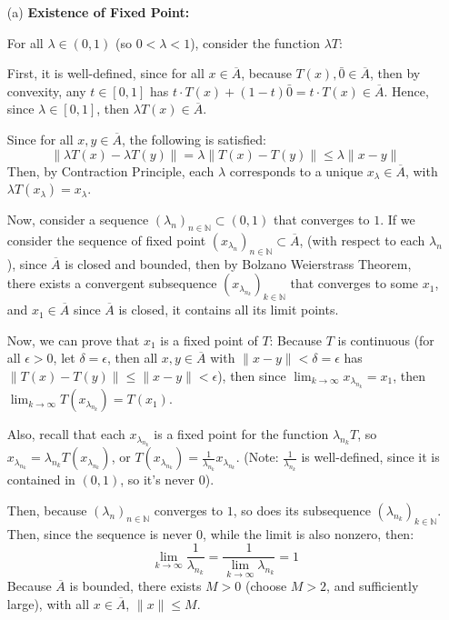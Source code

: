 \documentclass{article}
\begin{document}
\begin{itemize}
    \item[(a)] \textbf{Existence of Fixed Point:}
    
    For all $\lambda\in (0,1)$ (so $0<\lambda<1$), consider the function $\lambda T$: 
    
    First, it is well-defined, since for all $x\in \overline{A}$, because $T(x),\bar{0}\in \overline{A}$,
    then by convexity, any $t\in [0,1]$ has $t\cdot T(x)+(1-t)\bar{0} = t\cdot T(x)\in \overline{A}$.
    Hence, since $\lambda \in [0,1]$, then $\lambda T(x)\in \overline{A}$.

    \hfil
    
    Since for all $x,y\in \overline{A}$, the following is satisfied:
    $$\|\lambda T(x)-\lambda T(y)\| = \lambda\|T(x)-T(y)\| \leq \lambda \|x-y\|$$
    Then, by Contraction Principle, each $\lambda$ corresponds to a unique $x_\lambda\in \overline{A}$, with $\lambda T(x_\lambda)=x_\lambda$.

    \hfil

    Now, consider a sequence $(\lambda_n)_{n\in\mathbb{N}}\subset (0,1)$ that converges to $1$. If we consider the sequence of fixed point $(x_{\lambda_n})_{n\in\mathbb{N}}\subset \overline{A}$,
    (with respect to each $\lambda_n$), since $\overline{A}$ is closed and bounded, then by Bolzano Weierstrass Theorem, 
    there exists a convergent subsequence $(x_{\lambda_{n_k}})_{k\in\mathbb{N}}$ that converges to some $x_1$, and $x_1\in\overline{A}$ since $\overline{A}$ is closed, it contains all its limit points.

    \hfil

    Now, we can prove that $x_1$ is a fixed point of $T$: Because $T$ is continuous (for all $\epsilon>0$, let $\delta=\epsilon$, then all $x,y\in \overline{A}$ with $\|x-y\|<\delta=\epsilon$ has $\|T(x)-T(y)\|\leq \|x-y\|<\epsilon$),
    then since $\lim_{k\rightarrow\infty}x_{\lambda_{n_k}}=x_1$, then $\lim_{k\rightarrow\infty}T(x_{\lambda_{n_k}})=T(x_1)$.

    Also, recall that each $x_{\lambda_{n_k}}$ is a fixed point for the function $\lambda_{n_k}T$, so $x_{\lambda_{n_k}}=\lambda_{n_k}T(x_{\lambda_{n_k}})$, or $T(x_{\lambda_{n_k}})=\frac{1}{\lambda_{n_k}}x_{\lambda_{n_k}}$.
    (Note: $\frac{1}{\lambda_{n_k}}$ is well-defined, since it is contained in $(0,1)$, so it's never $0$).

    Then, because $(\lambda_n)_{n\in\mathbb{N}}$ converges to $1$, so does its subsequence $(\lambda_{n_k})_{k\in\mathbb{N}}$. Then, since the sequence is never $0$, while the limit is also nonzero, then:
    $$\lim_{k\rightarrow\infty}\frac{1}{\lambda_{n_k}}=\frac{1}{\lim_{k\rightarrow\infty}\lambda_{n_k}} = 1$$
    Because $\overline{A}$ is bounded, there exists $M>0$ (choose $M>2$, and sufficiently large), with all $x\in\overline{A}$, $\|x\|\leq M$.
    

\end{itemize}
\end{document}
